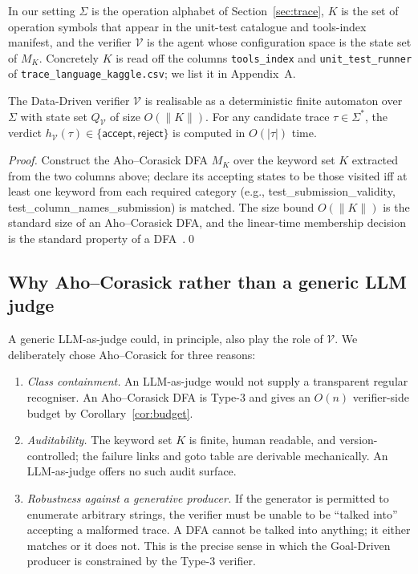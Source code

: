 In our setting $\Sigma$ is the operation alphabet of
Section~\ref{sec:trace}, $K$ is the set of operation symbols
that appear in the unit-test catalogue and tools-index manifest,
and the verifier $\mathcal{V}$ is the agent whose configuration
space is the state set of $M_K$.  Concretely $K$ is read off
the columns \texttt{tools\_index} and \texttt{unit\_test\_runner}
of \texttt{trace\_language\_kaggle.csv}; we list it in
Appendix~A.

\begin{proposition}
\label{prop:verifier-dfa}
The Data-Driven verifier $\mathcal{V}$ is realisable as a
deterministic finite automaton over $\Sigma$ with state set
$Q_\mathcal{V}$ of size $O(\|K\|)$.  For any candidate trace
$\tau\in\Sigma^*$, the verdict $h_\mathcal{V}(\tau)\in\{
\mathsf{accept},\mathsf{reject}\}$ is computed in $O(|\tau|)$
time.
\end{proposition}

\begin{proof}
Construct the Aho--Corasick DFA $M_K$ over the keyword set $K$
extracted from the two columns above; declare its accepting
states to be those visited iff at least one keyword from each
required category (e.g., \textsf{test\_submission\_validity},
\textsf{test\_column\_names\_submission}) is matched.  The size
bound $O(\|K\|)$ is the standard size of an Aho--Corasick DFA,
and the linear-time membership decision is the standard property
of a DFA~\cite{aho1975corasick,rabin1959finite}.\qed
\end{proof}

\subsection{Why Aho--Corasick rather than a generic LLM judge}

A generic LLM-as-judge could, in principle, also play the role of
$\mathcal{V}$.  We deliberately chose Aho--Corasick for three
reasons:
\begin{enumerate}
\item \emph{Class containment.}  An LLM-as-judge would not supply a transparent regular recogniser.  An Aho--Corasick DFA is Type-3 and gives an $O(n)$ verifier-side budget by Corollary~\ref{cor:budget}.
\item \emph{Auditability.}  The keyword set $K$ is finite, human
readable, and version-controlled; the failure links and goto
table are derivable mechanically.  An LLM-as-judge offers no
such audit surface.
\item \emph{Robustness against a generative producer.}  If the
generator is permitted to enumerate arbitrary strings, the
verifier must be unable to be ``talked into'' accepting a
malformed trace.  A DFA cannot be talked into anything; it
either matches or it does not.  This is the precise sense in
which the Goal-Driven producer is constrained by the
Type-3 verifier.
\end{enumerate}

